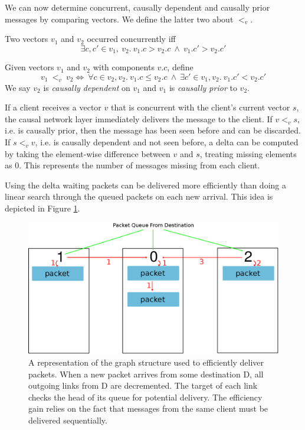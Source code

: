 \documentclass[12pt,a4paper,twoside,openright]{report}
\begin{document}
		We can now determine concurrent, causally dependent and causally prior messages by comparing vectors. We define the latter two about $<_v$.
				
		Two vectors $v_1$ and $v_2$ occurred concurrently iff \[\exists c,c' \in v_1,\ v_2.\ v_1.c > v_2.c\ \land\ v_1.c' > v_2.c'\]
		
		Given vectors $v_1$ and $v_2$ with components $v.c$, define \[v_1\ <_v\ v_2 \iff\ \forall c \in v_2, v_2.\ v_1.c \leq v_2.c\ \land\ \exists c' \in v_1, v_2.\ v_1.c' < v_2.c'\]
		We say $v_2$ is \textit{causally dependent} on $v_1$ and $v_1$ is \textit{causally prior} to $v_2$.
		
		If a client receives a vector $v$ that is concurrent with the client's current vector $s$, the causal network layer immediately delivers the message to the client. If $v <_v s$, i.e. is causally prior, then the message has been seen before and can be discarded. If $s <_v v$, i.e. is causally dependent and not seen before, a delta can be computed by taking the element-wise difference between $v$ and $s$, treating missing elements as $0$. This represents the number of messages missing from each client. 
		
		Using the delta waiting packets can be delivered more efficiently than doing a linear search through the queued packets on each new arrival. This idea is depicted in Figure \ref{fig:efficient}.
 		\begin{figure}[htb]
 		\centering
 		\includegraphics[width=1\linewidth]{figs/efficient_message_buffer.eps}
 		\caption[Dependency Graph in Message Buffer]{A representation of the graph structure used to efficiently deliver packets. When a new packet arrives from some destination D, all outgoing links from D are decremented. The target of each link checks the head of its queue for potential delivery. The efficiency gain relies on the fact that messages from the same client must be delivered sequentially.}
 		\label{fig:efficient}
 		\end{figure}
		
\end{document}
